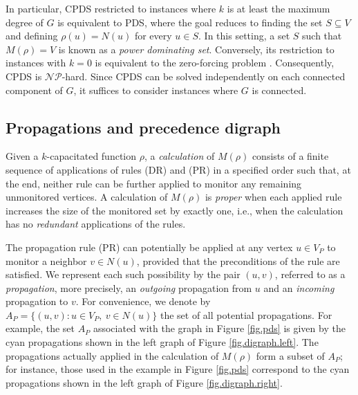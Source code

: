 \documentclass{article}
\newcommand{\NP}{{\mathcal{NP}}}
\begin{document}
\medskip

In particular, CPDS restricted to instances where $k$ is at least the maximum degree of $G$ is equivalent to PDS, where the goal reduces to finding the set $S \subseteq V$ and defining $\rho(u) = N(u)$ for every $u \in S$.
In this setting, a set $S$ such that $M(\rho) = V$ is known as a \emph{power dominating set}.
Conversely, its restriction to instances with $k = 0$ is equivalent to the zero-forcing problem \citep{Bozeman2019}.
Consequently, CPDS is $\NP$-hard.
Since CPDS can be solved independently on each connected component of $G$, it suffices to consider instances where $G$ is connected.

\subsection{Propagations and precedence digraph}

Given a $k$-capacitated function $\rho$, a \emph{calculation} of $M(\rho)$ consists of a finite sequence of applications of rules (DR) and (PR) in a specified order such that, at the end, neither rule can be further applied to monitor any remaining unmonitored vertices.
A calculation of $M(\rho)$ is \emph{proper} when each applied rule increases the size of the monitored set by exactly one, i.e., when the calculation has no \emph{redundant} applications of the rules.

The propagation rule (PR) can potentially be applied at any vertex $u \in V_P$ to monitor a neighbor $v \in N(u)$, provided that the preconditions of the rule are satisfied.
We represent each such possibility by the pair $(u,v)$, referred to as a \emph{propagation}, more precisely, an \emph{outgoing} propagation from $u$ and an \emph{incoming} propagation to $v$. 
For convenience, we denote by $A_P = \{(u,v): u \in V_P,\ v \in N(u)\}$ the set of all potential propagations.
For example, the set $A_P$ associated with the graph in Figure \ref{fig.pds} is given by the cyan propagations shown in the left graph of Figure \ref{fig.digraph.left}.
The propagations actually applied in the calculation of $M(\rho)$ form a subset of $A_P$; for instance, those used in the example in Figure \ref{fig.pds} correspond to the cyan propagations shown in the left graph of Figure \ref{fig.digraph.right}.
\end{document}
